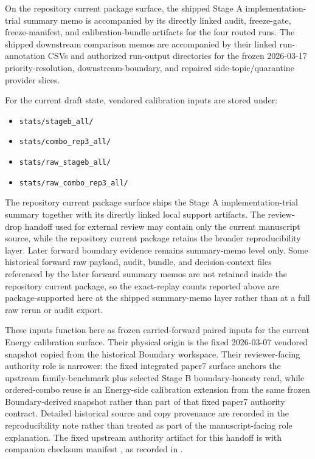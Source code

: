 \documentclass[11pt,a4paper]{article}
\begin{document}
On the repository current package surface, the shipped Stage A implementation-trial summary memo is accompanied by its
directly linked audit, freeze-gate, freeze-manifest, and calibration-bundle
artifacts for the four routed runs. The shipped downstream comparison memos
are accompanied by their linked run-annotation CSVs and authorized run-output
directories for the frozen 2026-03-17 priority-resolution, downstream-boundary,
and repaired side-topic/quarantine provider slices.

For the current draft state, vendored calibration inputs are stored under:
\begin{itemize}
  \item \texttt{stats/stageb\_all/}
  \item \texttt{stats/combo\_rep3\_all/}
  \item \texttt{stats/raw\_stageb\_all/}
  \item \texttt{stats/raw\_combo\_rep3\_all/}
\end{itemize}

The repository current package surface ships the Stage A implementation-trial summary
together with its directly linked local support artifacts. The review-drop
handoff used for external review may contain only the current manuscript source,
while the repository current package retains the broader reproducibility layer.
Later forward
boundary evidence remains summary-memo level only. Some historical forward raw
payload, audit, bundle, and decision-context files referenced by the later
forward summary memos are not retained inside the repository current package, so
the exact-replay counts reported above are package-supported here at the
shipped summary-memo layer rather than at a full raw rerun or audit export.

These inputs function here as frozen carried-forward paired inputs for the current
Energy calibration surface. Their physical origin is the fixed 2026-03-07
vendored snapshot copied from the historical Boundary workspace. Their reviewer-facing
authority role is narrower: the fixed integrated paper7 surface anchors the upstream
family-benchmark plus selected Stage B boundary-honesty read, while ordered-combo
reuse is an Energy-side calibration extension from the same frozen Boundary-derived
snapshot rather than part of that fixed paper7 authority contract. Detailed historical
source and copy provenance are recorded in the reproducibility note rather than treated
as part of the manuscript-facing role explanation.
The fixed upstream authority artifact for this handoff is
 with companion checksum
manifest , as recorded in
.
\end{document}
